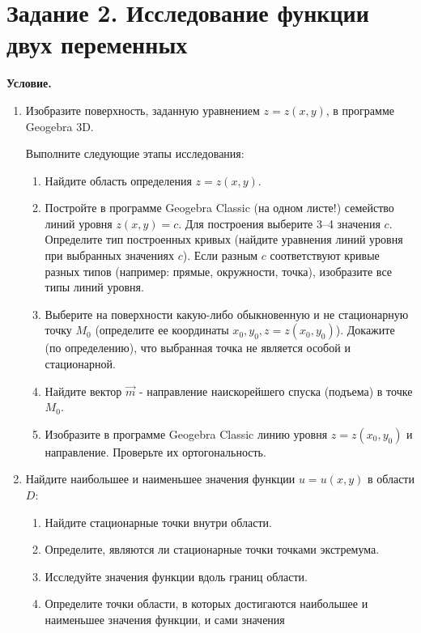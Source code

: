 \section{Задание 2. Исследование функции двух переменных}

\textbf{Условие.}

\begin{enumerate}[label=\Alph*.]
    \item Изобразите поверхность, заданную уравнением $z=z(x,y)$, в программе Geogebra 3D.

    Выполните следующие этапы исследования:

    \begin{enumerate}[label=\arabic*.]
        \item Найдите область определения $z = z(x, y)$.

        \item Постройте в программе Geogebra Classic (на одном листе!) семейство линий уровня $z(x, y) = c$.
        Для построения выберите 3–4 значения $c$.
        Определите тип построенных кривых (найдите уравнения линий уровня при выбранных значениях $c$).
        Если разным $c$ соответствуют кривые разных типов (например: прямые, окружности, точка), изобразите все типы линий уровня.

        \item Выберите на поверхности какую-либо обыкновенную и не стационарную точку $M_0$ (определите ее координаты $x_0, y_0, z = z(x_0, y_0)$).
        Докажите (по определению), что выбранная точка не является особой и стационарной.

        \item Найдите вектор $\overrightarrow{m}$ - направление наискорейшего спуска (подъема) в точке $M_0$.

        \item Изобразите в программе Geogebra Classic линию уровня $z = z(x_0, y_0)$ и направление.
        Проверьте их ортогональность.

    \end{enumerate}

    \item Найдите наибольшее и наименьшее значения функции $u = u(x, y)$ в области $D$:

    \begin{enumerate}[label=\arabic*.]
        \item Найдите стационарные точки внутри области.
        \item Определите, являются ли стационарные точки точками экстремума.
        \item Исследуйте значения функции вдоль границ области.
        \item Определите точки области, в которых достигаются наибольшее и наименьшее значения функции, и сами значения
    \end{enumerate}


\end{enumerate}
